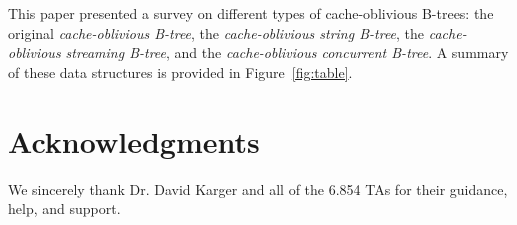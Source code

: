 \documentclass[preprint]{style}
\begin{document}
This paper presented a survey on different types of cache-oblivious B-trees: the 
original \textit{cache-oblivious B-tree}, the \textit{cache-oblivious string
B-tree}, the \textit{cache-oblivious streaming B-tree}, and the \textit{cache-oblivious
concurrent B-tree}. A summary of these data structures is provided
in Figure~\ref{fig:table}.

\vspace{0.1in}

\section{Acknowledgments}

We sincerely thank Dr. David Karger and all of the 6.854 TAs
for their guidance, help, and support.

\vspace{0.15in}


%



\end{document}
